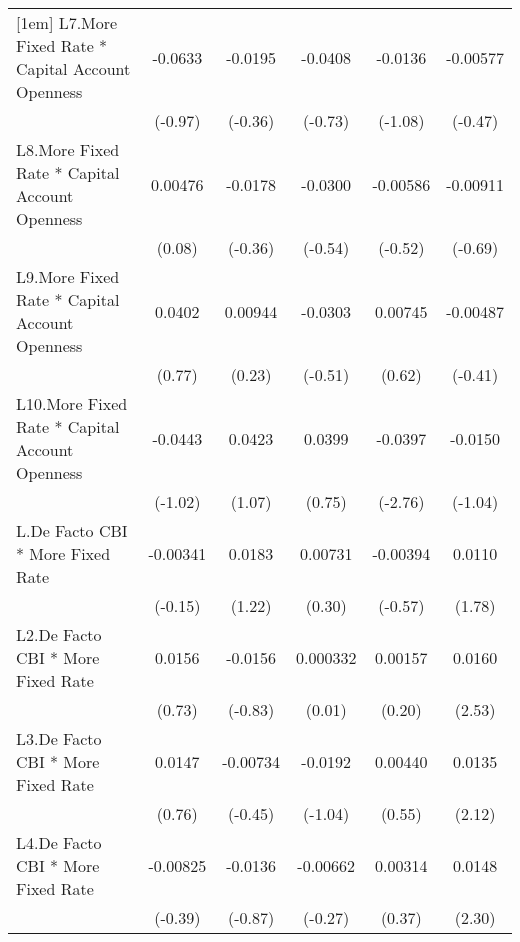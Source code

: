 {\begin{longtable}{l*{5}{c}}
[1em]
L7.More Fixed Rate * Capital Account Openness&  -0.0633         &  -0.0195         &  -0.0408         &  -0.0136         & -0.00577         \\
                &  (-0.97)         &  (-0.36)         &  (-0.73)         &  (-1.08)         &  (-0.47)         \\
[1em]
L8.More Fixed Rate * Capital Account Openness&  0.00476         &  -0.0178         &  -0.0300         & -0.00586         & -0.00911         \\
                &   (0.08)         &  (-0.36)         &  (-0.54)         &  (-0.52)         &  (-0.69)         \\
[1em]
L9.More Fixed Rate * Capital Account Openness&   0.0402         &  0.00944         &  -0.0303         &  0.00745         & -0.00487         \\
                &   (0.77)         &   (0.23)         &  (-0.51)         &   (0.62)         &  (-0.41)         \\
[1em]
L10.More Fixed Rate * Capital Account Openness&  -0.0443         &   0.0423         &   0.0399         &  -0.0397\sym{**} &  -0.0150         \\
                &  (-1.02)         &   (1.07)         &   (0.75)         &  (-2.76)         &  (-1.04)         \\
[1em]
L.De Facto CBI * More Fixed Rate& -0.00341         &   0.0183         &  0.00731         & -0.00394         &   0.0110         \\
                &  (-0.15)         &   (1.22)         &   (0.30)         &  (-0.57)         &   (1.78)         \\
[1em]
L2.De Facto CBI * More Fixed Rate&   0.0156         &  -0.0156         & 0.000332         &  0.00157         &   0.0160\sym{*}  \\
                &   (0.73)         &  (-0.83)         &   (0.01)         &   (0.20)         &   (2.53)         \\
[1em]
L3.De Facto CBI * More Fixed Rate&   0.0147         & -0.00734         &  -0.0192         &  0.00440         &   0.0135\sym{*}  \\
                &   (0.76)         &  (-0.45)         &  (-1.04)         &   (0.55)         &   (2.12)         \\
[1em]
L4.De Facto CBI * More Fixed Rate& -0.00825         &  -0.0136         & -0.00662         &  0.00314         &   0.0148\sym{*}  \\
                &  (-0.39)         &  (-0.87)         &  (-0.27)         &   (0.37)         &   (2.30)         \\

\end{longtable}}
